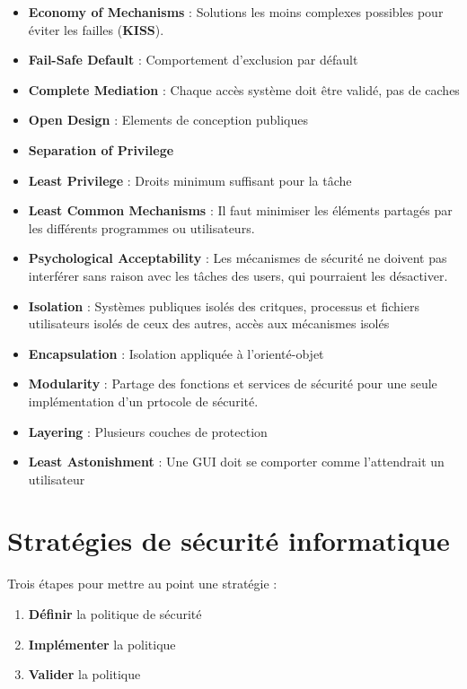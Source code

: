 \documentclass{report}
\begin{document}
		\begin{itemize}
		 	\item \textbf{Economy of Mechanisms} : Solutions les moins complexes possibles pour éviter les failles (\textbf{KISS}).\\
		 	\item \textbf{Fail-Safe Default} : Comportement d'exclusion par défault
		 	\item \textbf{Complete Mediation} : Chaque accès système doit être validé, pas de caches
		 	\item \textbf{Open Design} : Elements de conception publiques
		 	\item \textbf{Separation of Privilege}
		 	\item \textbf{Least Privilege} : Droits minimum suffisant pour la tâche
		 	\item \textbf{Least Common Mechanisms} : Il faut minimiser les éléments partagés par les différents programmes ou utilisateurs.
		 	\item \textbf{Psychological Acceptability} : Les mécanismes de sécurité ne doivent pas interférer sans raison avec les tâches des users, qui pourraient les désactiver.
		 	\item \textbf{Isolation} : Systèmes publiques isolés des critques, processus et fichiers utilisateurs isolés de ceux des autres, accès aux mécanismes isolés
		 	\item \textbf{Encapsulation} : Isolation appliquée à l'orienté-objet
		 	\item \textbf{Modularity} : Partage des fonctions et services de sécurité pour une seule implémentation d'un prtocole de sécurité.
		 	\item \textbf{Layering} : Plusieurs couches de protection
		 	\item \textbf{Least Astonishment} : Une GUI doit se comporter comme l'attendrait un utilisateur\\
		 \end{itemize} 

	\section{Stratégies de sécurité informatique}

		Trois étapes pour mettre au point une stratégie : \\

		\begin{enumerate}
			\item \textbf{Définir} la politique de sécurité
			\item \textbf{Implémenter} la politique
			\item \textbf{Valider} la politique\\
		\end{enumerate}
\end{document}

